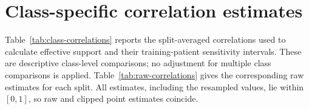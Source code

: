 \section{Class-specific correlation estimates}
\label{sec:class-details}
Table~\ref{tab:class-correlations} reports the split-averaged correlations used to calculate effective support and their training-patient sensitivity intervals. These are descriptive class-level comparisons; no adjustment for multiple class comparisons is applied. Table~\ref{tab:raw-correlations} gives the corresponding raw estimates for each split. All estimates, including the resampled values, lie within $[0,1]$, so raw and clipped point estimates coincide.

\begin{table}[htbp]
\centering
\footnotesize
\setlength{\tabcolsep}{4pt}
\renewcommand{\arraystretch}{1.08}

\caption{Class-specific correlations averaged over three training splits, with separate 95\% training-patient sensitivity intervals for each measure. Full-feature correlation is higher in 22 of 30 classes; increases are not uniform across cancer types.}
\label{tab:class-correlations}
\end{table}

\clearpage
\begin{table}[htbp]
\centering
\footnotesize
\setlength{\tabcolsep}{4pt}
\renewcommand{\arraystretch}{1.08}

\caption{Unclipped correlations for each class and training split, computed on the same sampled patients and patches for both measures. Every estimate is finite and positive. Split variation is descriptive because the training partitions overlap.}
\label{tab:raw-correlations}
\end{table}
